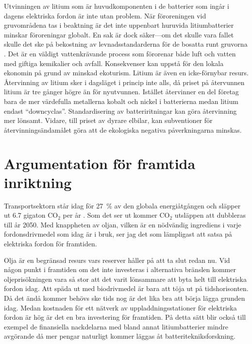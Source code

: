 \documentclass{article}
\begin{document}
Utvinningen av litium som är huvudkomponenten i de batterier som ingår i dagens elektriska fordon
är inte utan problem.
När föroreningen vid gruvområdena tas i beaktning är det inte uppenbart huruvida
litiumbatterier minskar föroreningar globalt.
En sak är dock säker---om det skulle vara fallet skulle det ske på bekostning
av levnadsstandarderna för de bosatta runt gruvorna \autocite{persson18}.
Det är en väldigt vattenkrävande process som förorenar både luft och vatten
med giftiga kemikalier och avfall.
Konsekvenser kan uppstå för den lokala ekonomin på grund av minskad ekoturism.
Litium är även en icke-förnybar resurs.
Återvinning av litium sker i dagsläget i princip inte alls,
då priset på återvunnen litium är tre gånger högre än för nyutvunnen.
Istället återvinner en del företag bara de mer värdefulla metallerna kobalt och nickel
i batterierna medan litium endast ``downcyclas''.
Standardisering av batteriritningar kan göra återvinning mer lönsamt.
Vidare, till priset av dyrare elbilar, kan subventioner för återvinningsändamålet
göra att de ekologiska negativa påverkningarna minskas.

\section{Argumentation för framtida inriktning}

Transportsektorn står idag för \SI{27}{\percent} av den globala energiåtgången
och släpper ut \num{6.7} gigaton CO$_2$ per år \autocite{edenhofer15}.
Som det ser ut kommer CO$_2$ utsläppen att dubbleras till år 2050.
Med knappheten av oljan,
vilken är en nödvändig ingrediens i varje fordonsdrivmedel som idag är i bruk,
ser jag det som lämpligast att satsa på elektriska fordon för framtiden.

Olja är en begränsad resurs vars reserver håller på att ta slut redan nu.
Vid någon punkt i framtiden om det inte investeras i alternativa bränslen
kommer oljeprisökningen vara så stor att det varit lönsammare att byta helt
till elektriska fordon idag.
Att späda ut med biodrivmedel är bara att töja ut på tidshorisonten.
Då det ändå kommer behövs ske tids nog är det lika bra att börja lägga grunden idag.
Medan kostnaden för ett nätverk av uppladdningsstationer för elektriska fordon
är hög är det en bra investering för framtiden.
På detta sätt blir också till exempel de finansiella nackdelarna med
bland annat litiumbatterier mindre avgörande då
mer pengar naturligt kommer läggas åt batteritekniksforskning.
\end{document}
